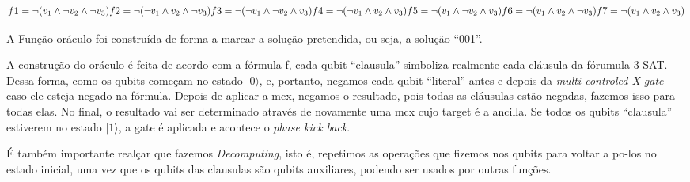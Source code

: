 \documentclass[11pt]{article}
\begin{document}
\[
f1 = \neg (v_1 \land \neg v_2 \land \neg v_3) \\
f2 = \neg (\neg v_1 \land v_2 \land \neg v_3) \\
f3 = \neg (\neg v_1 \land \neg v_2 \land v_3) \\
f4 = \neg (\neg v_1 \land v_2 \land v_3) \\
f5 = \neg (v_1 \land \neg v_2 \land v_3) \\
f6 = \neg (v_1 \land v_2 \land \neg v_3) \\
f7 = \neg (v_1 \land v_2 \land v_3)
\]

    A Função oráculo foi construída de forma a marcar a solução pretendida,
ou seja, a solução ``001''.

A construção do oráculo é feita de acordo com a fórmula f, cada qubit
``clausula'' simboliza realmente cada cláusula da fórumula 3-SAT. Dessa
forma, como os qubits começam no estado \(|0\rangle\), e, portanto,
negamos cada qubit ``literal'' antes e depois da \emph{multi-controled X
gate} caso ele esteja negado na fórmula. Depois de aplicar a mcx,
negamos o resultado, pois todas as cláusulas estão negadas, fazemos isso
para todas elas. No final, o resultado vai ser determinado através de
novamente uma mcx cujo target é a ancilla. Se todos os qubits
``clausula'' estiverem no estado \(|1\rangle\), a gate é aplicada e
acontece o \emph{phase kick back}.

É também importante realçar que fazemos \emph{Decomputing}, isto é,
repetimos as operações que fizemos nos qubits para voltar a po-los no
estado inicial, uma vez que os qubits das clausulas são qubits
auxiliares, podendo ser usados por outras funções.
\end{document}
